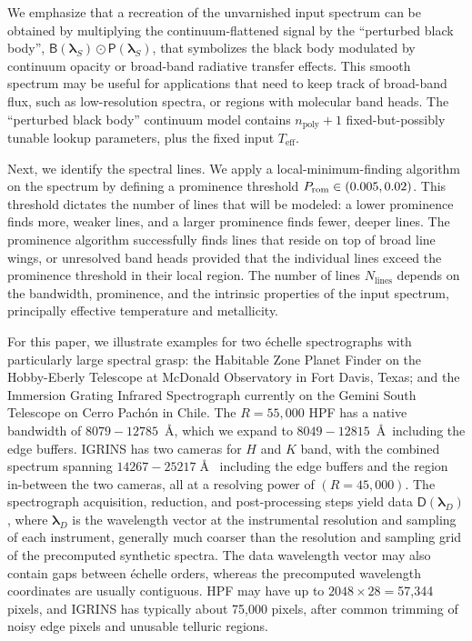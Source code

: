 \documentclass[modern]{aastex631}
\begin{document}

We emphasize that a recreation of the unvarnished input spectrum can be obtained by multiplying the continuum-flattened signal by the ``perturbed black body'', $\mathsf{B}(\bm{\lambda}_S)\odot \mathsf{P}(\bm{\lambda}_S)$, that symbolizes the black body modulated by continuum opacity or broad-band radiative transfer effects. This smooth spectrum may be useful for applications that need to keep track of broad-band flux, such as low-resolution spectra, or regions with molecular band heads. The ``perturbed black body'' continuum model contains $n_{\mathrm{poly}}+1$ fixed-but-possibly tunable lookup parameters, plus the fixed input $T_{\mathrm{eff}}$.

Next, we identify the spectral lines. We apply a local-minimum-finding algorithm on the spectrum by defining a prominence threshold $P_{\rm rom} \in (0.005, 0.02)$. This threshold dictates the number of lines that will be modeled: a lower prominence finds more, weaker lines, and a larger prominence finds fewer, deeper lines. The prominence algorithm successfully finds lines that reside on top of broad line wings, or unresolved band heads provided that the individual lines exceed the prominence threshold in their local region. The number of lines $N_{\mathrm{lines}}$ depends on the bandwidth, prominence, and the intrinsic properties of the input spectrum, principally effective temperature and metallicity.

For this paper, we illustrate examples for two \'echelle spectrographs with particularly large spectral grasp: the Habitable Zone Planet Finder \citep[HPF,][]{2014SPIE.9147E..1GM} on the Hobby-Eberly Telescope at McDonald Observatory in Fort Davis, Texas; and the Immersion Grating Infrared Spectrograph \citep[IGRINS,][]{park14}
currently on the Gemini South Telescope on Cerro Pach\'on in Chile. The $R=55,000$ HPF has a native bandwidth of $8079-12785$~\AA, which we expand to $8049-12815$~\AA~including the edge buffers. IGRINS has two cameras for $H$ and $K$ band, with the combined spectrum spanning $14267-25217\;$\AA~ including the edge buffers and the region in-between the two cameras, all at a resolving power of $(R=45,000)$. The spectrograph acquisition, reduction, and post-processing steps yield data $\mathsf{D}(\bm{\lambda}_{D})$, where $\bm{\lambda}_{D}$ is the wavelength vector at the instrumental resolution and sampling of each instrument, generally much coarser than the resolution and sampling grid of the precomputed synthetic spectra. The data wavelength vector may also contain gaps between \'echelle orders, whereas the precomputed wavelength coordinates are usually contiguous. HPF may have up to $2048\times28=$57,344 pixels, and IGRINS has typically about 75,000 pixels, after common trimming of noisy edge pixels and unusable telluric regions.
\end{document}
